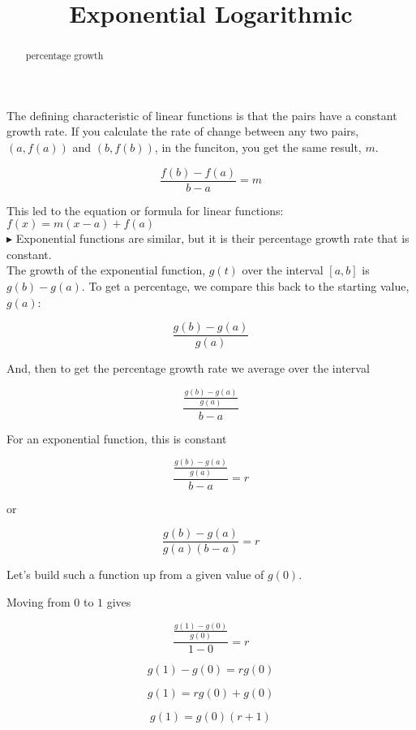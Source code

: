 \documentclass{ximera}
\title{Exponential Logarithmic}
\begin{document}
\begin{abstract}
percentage growth
\end{abstract}
\maketitle




The defining characteristic of linear functions is that the pairs have a constant growth rate. If you calculate the rate of change between any two pairs, $(a, f(a))$ and $(b, f(b))$, in the funciton, you get the same result, $m$.


\[   \frac{f(b)-f(a)}{b-a} = m       \]

This led to the equation or formula for linear functions:  $f(x) = m(x-a) + f(a)$ \\





$\blacktriangleright$ Exponential functions are similar, but it is their percentage growth rate that is constant.   \\


The growth of the exponential function, $g(t)$ over the interval $[a, b]$ is $g(b)-g(a)$. To get a percentage, we compare this back to the starting value, $g(a)$: 

\[      \frac{g(b)-g(a)}{g(a)}    \]

And, then to get the percentage growth rate we average over the interval



\[      \frac{\frac{g(b)-g(a)}{g(a)}}{b-a}    \]



For an exponential function, this is constant


\[      \frac{\frac{g(b)-g(a)}{g(a)}}{b-a}  = r  \]

or

\[      \frac{g(b)-g(a)}{g(a)(b-a)}  = r  \]



Let's build such a function up from a given value of $g(0)$. 

Moving from $0$ to $1$ gives

\[      \frac{\frac{g(1)-g(0)}{g(0)}}{1-0}  = r  \]


\[      g(1)-g(0) = r g(0)  \]


\[      g(1) = r g(0) + g(0)  \]

\[      g(1) =  g(0) (r + 1)  \]
\end{document}
